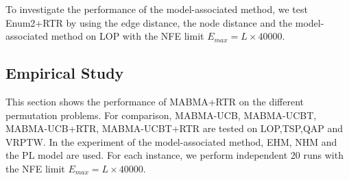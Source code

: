 To investigate the performance of the model-associated method, we test Enum2+RTR by using the edge distance, the node distance and the model-associated method on LOP with the NFE limit $E_{max} = L \times 40000$. %

\subsection{Empirical Study}
This section shows the performance of MABMA+RTR on the different permutation problems. For comparison, MABMA-UCB, MABMA-UCBT, MABMA-UCB+RTR, MABMA-UCBT+RTR are tested on LOP,TSP,QAP and VRPTW. In the experiment of the model-associated method, EHM, NHM and the PL model are used. For each instance, we perform independent 20 runs with the NFE limit $E_{max} = L \times 40000$.


